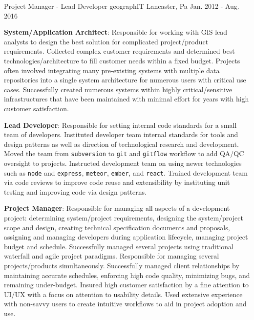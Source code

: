 \begin{cventries}
  \cventry
    {Project Manager - Lead Developer}
    {geographIT}
    {Lancaster, Pa}
    {Jan. 2012 - Aug. 2016}
    {
      \begin{cvitems}
        \item{\textbf{System/Application Architect}: Responsible for working with GIS lead analysts to design the best solution for complicated project/product requirements. Collected complex customer requirements and determined best technologies/architecture to fill customer needs within a fixed budget.  Projects often involved integrating many pre-existing systems with multiple data repositories into a single system architecture for numerous users with critical use cases. Successfully created numerous systems within highly critical/sensitive infrastructures that have been maintained with minimal effort for years with high customer satisfaction. }
        \bigskip
        \item{\textbf{Lead Developer}: Responsible for setting internal code standards for a small team of developers.  Instituted developer team internal standards for tools and design patterns as well as direction of technological research and development.  Moved the team from \texttt{subversion} to \texttt{git} and \texttt{gitflow} workflow to add QA/QC oversight to projects.  Instructed development team on using newer technologies such as \texttt{node} and \texttt{express}, \texttt{meteor}, \texttt{ember}, and \texttt{react}.  Trained development team via code reviews to improve code reuse and extensibility by instituting unit testing and improving code via design patterns. }
        \bigskip
        \item{\textbf{Project Manager}: Responsible for managing all aspects of a development project: determining system/project requirements, designing the system/project scope and design, creating technical specification documents and proposals, assigning and managing developers during application lifecycle, managing project budget and schedule.  Successfully managed several projects using traditional waterfall and agile project paradigms.  Responsible for managing several projects/products simultaneously.  Successfully managed client relationships by maintaining accurate schedules, enforcing high code quality, minimizing bugs, and remaining under-budget. Insured high customer satisfaction by a fine attention to UI/UX with a focus on attention to usability details.  Used extensive experience with non-savvy users to create intuitive workflows to aid in project adoption and use. }
      \end{cvitems}
}
\end{cventries}
